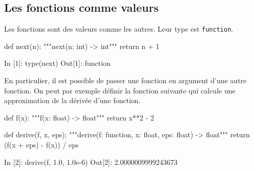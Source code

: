\documentclass{magnoliaold}
\begin{document}
\subsection{Les fonctions comme valeurs}

Les fonctions sont des valeurs comme les autres. Leur type est \verb_function_.

\begin{pythoncodeline}
def next(n):
    """next(n: int) -> int"""
    return n + 1
\end{pythoncodeline}

\begin{pythoncode}
In [1]: type(next)
Out[1]: function
\end{pythoncode}

\noindent
En particulier, il est possible de passer une fonction en argument d'une autre fonction. On
peut par exemple définir la fonction suivante qui calcule une approximation de la dérivée
d'une fonction.

\begin{pythoncodeline}
def f(x):
    """f(x: float) -> float"""
    return x**2 - 2

def derive(f, x, eps):
    """derive(f: function, x: float, eps: float) -> float"""
    return (f(x + eps) - f(x)) / eps
\end{pythoncodeline}

\begin{pythoncode}
In [2]: derive(f, 1.0, 1.0e-6)
Out[2]: 2.0000009999243673
\end{pythoncode}
\end{document}
